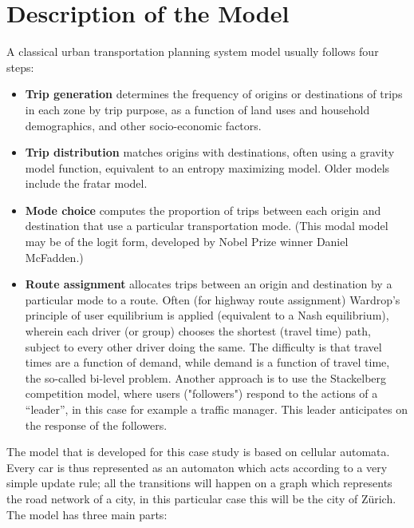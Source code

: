 \documentclass[11pt]{article}
\begin{document}
\section{Description of the Model}
A classical urban transportation planning system model usually follows four steps\cite{mcnally2008four}:
\begin{itemize}
	\item \textbf{Trip generation} determines the frequency of origins or destinations of trips in each zone by trip purpose, as a function of land uses and household demographics, and other socio-economic factors.

	\item \textbf{Trip distribution} matches origins with destinations, often using a gravity model function, equivalent to an entropy maximizing model. Older models include the fratar model.

	\item \textbf{Mode choice} computes the proportion of trips between each origin and destination that use a particular transportation mode. (This modal model may be of the logit form, developed by Nobel Prize winner Daniel McFadden.)

	\item \textbf{Route assignment} allocates trips between an origin and destination by a particular mode to a route. Often (for highway route assignment) Wardrop's principle of user equilibrium is applied (equivalent to a Nash equilibrium), wherein each driver (or group) chooses the shortest (travel time) path, subject to every other driver doing the same. The difficulty is that travel times are a function of demand, while demand is a function of travel time, the so-called bi-level problem. Another approach is to use the Stackelberg competition model, where users ("followers") respond to the actions of a ``leader'', in this case for example a traffic manager. This leader anticipates on the response of the followers.
\end{itemize}

The model that is developed for this case study is based on cellular automata. Every car is thus represented as an automaton which acts according to a very simple update rule; all the transitions will happen on a graph which represents the road network of a city, in this particular case this will be the city of Z\"urich. The model has three main parts:
\end{document}
